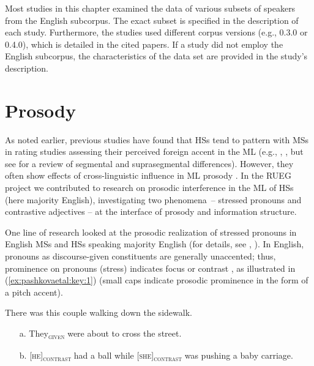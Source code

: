 \documentclass[output=paper,colorlinks,citecolor=brown]{langscibook}
\begin{document}
Most studies in this chapter examined the data of various subsets of speakers from the English subcorpus. The exact subset is specified in the description of each study. Furthermore, the studies used different corpus versions (e.g., 0.3.0 or 0.4.0), which is detailed in the cited papers. If a study did not employ the English subcorpus, the characteristics of the data set are provided in the study’s description.


\section{Prosody} \label{sec:pashkovaetal:Prosody}

As noted earlier, previous studies have found that HSs tend to pattern with MSs in rating studies assessing their perceived foreign accent in the ML (e.g., \cite{Kupisch2014a}, \cite{Lloyd-Smith2020}, but see \cite[138--153]{Polinsky2018book} for a review of segmental and suprasegmental differences). However, they often show effects of cross-linguistic influence in ML prosody \parencite{queen2012, VanRijswijk2017, Dehe2018}. In the RUEG project we contributed to research on prosodic interference in the ML of HSs (here majority English), investigating two phenomena~-- stressed pronouns and contrastive adjectives -- at the interface of prosody and information structure. 

One line of research looked at the prosodic realization of stressed pronouns in English MSs and HSs speaking majority English (for details, see \cite{bottcher2021}, \cite{bottcher2020}). In English, pronouns as discourse-given constituents are generally unaccented; thus, prominence on pronouns (stress) indicates focus or contrast \parencite{krifka2008, Selkirk1996}, as illustrated in (\ref{ex:pashkovaetal:key:1}) (small caps indicate prosodic prominence in the form of a pitch accent).

\ea
\label{ex:pashkovaetal:key:1}
There was this couple walking down the sidewalk.
    \begin{enumerate}
        \item[a.] They\textsubscript{\textsc{given}} were about to cross the street.
        \item[b.] [\textsc{he}]\textsc{\textsubscript{contrast}} had a ball while [\textsc{she}]\textsc{\textsubscript{contrast}} was pushing a baby carriage.
    \end{enumerate}
\z 
\end{document}
